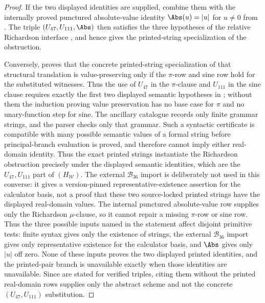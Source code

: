 \begin{proof}
If the two displayed identities are supplied, combine them with the internally
proved punctured absolute-value identity
\(\Abs(u)=|u|\) for \(u\ne0\) from
.  The triple
\((U_{47},U_{111},\Abs)\) then satisfies the three hypotheses of the relative
Richardson interface
,
and hence gives the printed-string specialization of the obstruction.

Conversely,  proves that the concrete
printed-string specialization of that structural translation is value-preserving
only if the \(\pi\)-row and sine row hold for the substituted witnesses.  Thus
the use of \(U_{47}\) in the \(\pi\)-clause and \(U_{111}\) in the sine clause
requires exactly the first two displayed semantic hypotheses in
;
without them the induction proving value preservation has no base case for
\(\pi\) and no unary-function step for sine.  The ancillary catalogue records
only finite grammar strings, and the parser checks only that grammar.  Such a
syntactic certificate is compatible with many possible semantic values of a
formal string before principal-branch evaluation is proved, and therefore cannot
imply either real-domain identity.  Thus the exact printed strings instantiate
the Richardson obstruction precisely under the displayed semantic identities,
which are the \(U_{47},U_{111}\) part of \((H_{\mathcal W})\).  The external
\(\mathcal B_{36}\) import is deliberately not used in this converse: it gives a
version-pinned representative-existence assertion for the calculator basis, not
a proof that these two source-locked printed strings have the displayed
real-domain values.
The internal punctured absolute-value row supplies only the Richardson
\(\mu\)-clause, so it cannot repair a missing \(\pi\)-row or sine row.  Thus the
three possible inputs named in the statement affect disjoint primitive tests:
finite syntax gives only the existence of strings, the external
\(\mathcal B_{36}\) import gives only representative existence for the calculator
basis, and \(\Abs\) gives only \(|u|\) off zero.  None of these inputs proves the
two displayed printed identities, and the printed-pair branch is unavailable
exactly when those identities are unavailable.  Since
 are stated for
verified triples, citing them without the printed real-domain rows supplies only
the abstract scheme and not the concrete \((U_{47},U_{111})\) substitution.
\end{proof}

